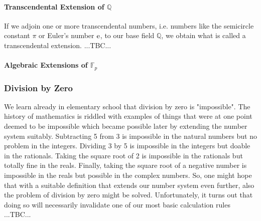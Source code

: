 


\paragraph{Transcendental Extension of $\mathbb{Q}$}
If we adjoin one or more transcendental numbers, i.e. numbers like the semicircle constant $\pi$ or Euler's number $\operatorname{\mathrm{e}}$, to our base field $\mathbb{Q}$, we obtain what is called a transcendental extension. ...TBC...



\paragraph{Algebraic Extensions of $\mathbb{F}_p$}




\subsubsection{Division by Zero}
We learn already in elementary school that division by zero is "impossible". The history of mathematics is riddled with examples of things that were at one point deemed to be impossible which became possible later by extending the number system suitably. Subtracting 5 from 3 is impossible in the natural numbers but no problem in the integers. Dividing 3 by 5 is impossible in the integers but doable in the rationals. Taking the square root of 2 is impossible in the rationals but totally fine in the reals. Finally, taking the square root of a negative number is impossible in the reals but possible in the complex numbers. So, one might hope that with a suitable definition that extends our number system even further, also the problem of division by zero might be solved. Unfortunately, it turns out that doing so will necessarily invalidate one of our most basic calculation rules ...TBC...

